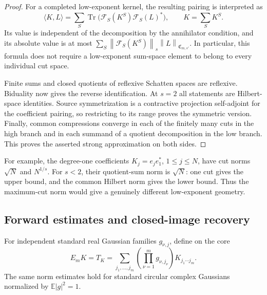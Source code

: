 \documentclass[11pt,a4paper]{amsart}
\numberwithin{equation}{section}
\theoremstyle{definition}
\theoremstyle{remark}
\newcommand{\E}{\mathbb E}
\newcommand{\Coeff}{\mathfrak C}
\newcommand{\Flat}{\mathcal F}
\DeclareMathOperator{\Tr}{Tr}
\newcommand{\norm}[1]{\left\lVert#1\right\rVert}
\begin{document}
\begin{proof}
For a completed low-exponent kernel, the resulting pairing is interpreted as
\[
 \langle K,L\rangle
 =\sum_S\Tr\big(\Flat_S(K^S)\Flat_S(L)^*\big),
 \qquad K=\sum_SK^S.
\]
Its value is independent of the decomposition by the annihilator condition, and its absolute value is at most
$\sum_S\norm{\Flat_S(K^S)}_s\norm L_{\Coeff_{m,s'}}$.
In particular, this formula does not require a low-exponent sum-space element to belong to every individual cut space.

Finite sums and closed quotients of reflexive Schatten spaces are reflexive. Biduality now gives the reverse identification. At $s=2$ all statements are Hilbert-space identities. Source symmetrization is a contractive projection self-adjoint for the coefficient pairing, so restricting to its range proves the symmetric version. Finally, common compressions converge in each of the finitely many cuts in the high branch and in each summand of a quotient decomposition in the low branch. This proves the asserted strong approximation on both sides.
\end{proof}

For example, the degree-one coefficients $K_j=e_je_1^*$, $1\le j\le N$, have cut norms $\sqrt N$ and $N^{1/s}$. For $s<2$, their quotient-sum norm is $\sqrt N$: one cut gives the upper bound, and the common Hilbert norm gives the lower bound. Thus the maximum-cut norm would give a genuinely different low-exponent geometry.

\subsection{Forward estimates and closed-image recovery}
For independent standard real Gaussian families $g_{\nu,j}$, define on the core
\begin{equation}\label{eq:dec-eval}
 E_mK=T_K=\sum_{j_1,\ldots,j_m}
       \left(\prod_{\nu=1}^mg_{\nu,j_\nu}\right)K_{j_1\cdots j_m}.
\end{equation}
The same norm estimates hold for standard circular complex Gaussians normalized by $\E|g|^2=1$.
\end{document}
